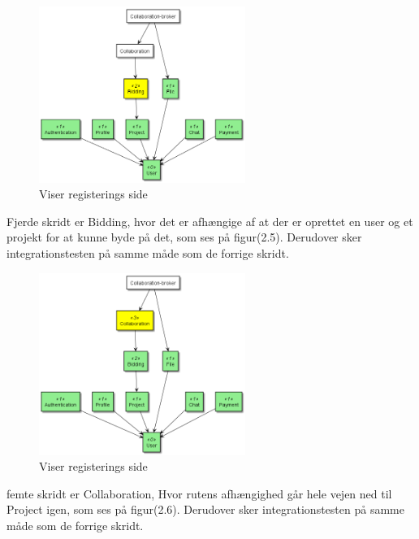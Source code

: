 \begin{figure}[ht]
    \centering
\includegraphics[width=0.6\textwidth]{integrationstest-image/step_4_dependencieTree.png}
\caption{Viser registerings side}
\label{fig:figure2}
\end{figure}

Fjerde skridt er Bidding, hvor det er afhængige af at der er oprettet en user og et projekt for at kunne byde på det, som ses på figur(2.5). Derudover sker integrationstesten på samme måde som de forrige skridt. 

\newpage
\begin{figure}[ht]
    \centering
\includegraphics[width=0.6\textwidth]{integrationstest-image/step_5_dependencieTree.png}
\caption{Viser registerings side}
\label{fig:figure2}
\end{figure}

femte skridt er Collaboration, Hvor rutens afhængighed går hele vejen ned til Project igen, som ses på figur(2.6). Derudover sker integrationstesten på samme måde som de forrige skridt. 

